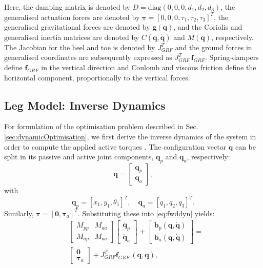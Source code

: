 \documentclass[letterpaper, 10 pt, conference]{ieeeconf}  %
\begin{document}
Here, the damping matrix is denoted by $D = \mathrm{diag} (0,0,0,d_1,d_2,d_3)$, the generalised actuation forces are denoted by $\boldsymbol{\tau} = [0,0,0,\tau_1,\tau_2,\tau_3]^T$, the generalised gravitational forces are denoted by $\mathbf{g(q)}$, and the Coriolis and generalised inertia matrices are denoted by $C\mathbf{(q, \dot q)}$ and $M(\mathbf{q})$, respectively. The Jacobian for the heel and toe is denoted by $J_{GRF}^T$ and the ground forces in generalised coordinates are subsequently expressed as $J_{GRF}^T \, \mathbf{f}_{GRF}$. Spring-dampers define $\mathbf{f}_{GRF}$ in the vertical direction and Coulomb and viscous friction define the horizontal component, proportionally to the vertical forces.

\subsection{Leg Model: Inverse Dynamics}
For formulation of the optimisation problem described in Sec. \ref{sec:dynamicOptimisation}, we first derive the inverse dynamics of the system in order to compute the applied active torques \cite{nakanishi2007inverse}. The configuration vector $\mathbf{q}$ can be split in its passive and active joint components, $\mathbf{q}_p$ and $\mathbf{q}_a$, respectively:
\begin{equation}
\mathbf{q} =
\begin{bmatrix}
	\mathbf{q}_p \\
	\mathbf{q}_a
\end{bmatrix},
\end{equation}
with
\begin{equation}
	\mathbf{q}_p = [x_1,y_1,\theta_1]^T, \quad  
	\mathbf{q}_a = [q_1,q_2,q_3]^T.
\end{equation}
\noindent
Similarly, $\boldsymbol{\tau} = \left[\mathbf{0},\boldsymbol{\tau}_a\right]^T$. Substituting these into \eqref{eq:fwddyn} yields:
\begin{equation}
	\begin{aligned}
		&\left[\begin{array}{cc}  
		M_{pp} & M_{aa}\\
		M_{ap} & M_{aa}
		\end{array} \right]
		\left[\begin{array}{c}  
		\mathbf{\ddot q}_p\\
		\mathbf{\ddot q}_a
		\end{array} \right] +
		\left[\begin{array}{c}  
		\mathbf{b}_p \mathbf{(q,\dot q)}\\
		\mathbf{b}_a \mathbf{(q,\dot q)}
		\end{array} \right] 
		=\\
		&\left[\begin{array}{c}  
		\mathbf{0}\\
		\boldsymbol{\tau}_a
		\end{array} \right] 
		+
		J_{GRF}^T \mathbf{f}_{GRF} \, \mathbf{(q, \dot q)},
	\end{aligned}
	\label{eq:ik}
\end{equation}		
\end{document}
